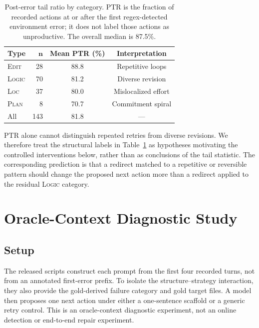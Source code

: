 \documentclass{article}
\begin{document}
\begin{table}[H]
\centering
\small
\begin{tabular}{@{}lrcc@{}}
\toprule
\textbf{Type} & $\boldsymbol{n}$ & \textbf{Mean PTR (\%)} & \textbf{Interpretation} \\
\midrule
\textsc{Edit} & 28 & 88.8 & Repetitive loops \\
\textsc{Logic} & 70 & 81.2 & Diverse revision \\
\textsc{Loc} & 37 & 80.0 & Mislocalized effort \\
\textsc{Plan} & 8 & 70.7 & Commitment spiral \\
\midrule
All & 143 & 81.8 & --- \\
\bottomrule
\end{tabular}
\caption{Post-error tail ratio by category. PTR is the fraction of recorded
actions at or after the first regex-detected environment error; it does not
label those actions as unproductive.  The overall median is 87.5\%.}
\label{tab:cascade}
\end{table}


PTR alone cannot distinguish repeated retries from diverse revisions.  We
therefore treat the structural labels in Table~\ref{tab:cascade} as hypotheses
motivating the controlled interventions below, rather than as conclusions of
the tail statistic.  The corresponding prediction is that a redirect matched
to a repetitive or reversible pattern should change the proposed next action
more than a redirect applied to the residual \textsc{Logic} category.

\section{Oracle-Context Diagnostic Study}
\label{sec:scaffolding}

\subsection{Setup}

The released scripts construct each prompt from the first four recorded turns,
not from an annotated first-error prefix.  To isolate the structure--strategy
interaction, they also provide the gold-derived failure category and gold target
files.  A model then proposes one next action under either a one-sentence
scaffold or a generic retry control.  This is an oracle-context diagnostic
experiment, not an online detection or end-to-end repair experiment.
\end{document}
